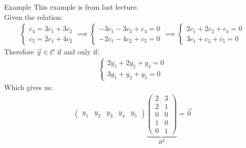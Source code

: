 \begin{parag}{Example}
    This example is from last lecture.\\
    Given the relation:
    \begin{align*} 
        \begin{cases}
            c_4 = 3c_1 + 3c_2 \\ c_5 =  2c_1 + 4c_2
        \end{cases} \implies 
        \begin{cases}
            -3c_1 -3c_2  + c_4 = 0\\
            -2c_1 -4c_2 + c_5 = 0
        \end{cases} \implies 
        \begin{cases}
            2c_1 + 2c_2 + c_4 = 0\\
            3c_1 + c_2 + c_5 = 0
        \end{cases}
    \end{align*}
    Therefore $\vec{y} \in \mathcal{C}$ if and only if:
    \begin{align*} 
        \begin{cases}
            2y_1 + 2y_2 + y_4 = 0\\
            3y_1 + y_2 + y_5 = 0
        \end{cases}
    \end{align*}
    Which gives us:
    \begin{align*} 
        \begin{pmatrix} y_1 & y_2 & y_3 & y_4 & y_5 \end{pmatrix} \underbrace{ \begin{pmatrix} 2 & 3 \\ 2 & 1 \\ 0 & 0 \\ 1  & 0 \\ 0 & 1 \end{pmatrix}}_{H^T} =  \vec{0}
    \end{align*}
\end{parag}


